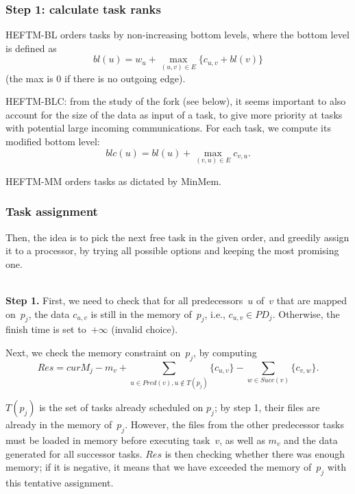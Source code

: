 \documentclass[sigconf,review,anonymous]{acmart}
\newcommand{\curM}{curM}
\begin{document}
\subsubsection{Step 1: calculate task ranks}

HEFTM-BL orders tasks by non-increasing bottom levels, where the bottom
level is defined as
$$bl(u) = w_u + \max_{(u,v)\in E} \{c_{u,v} + bl(v)\}$$
 (the max is 0 if there is no outgoing edge). 
 
 HEFTM-BLC: from the study of the fork (see below), it seems important
 to also account for the size of the data as input of a task,
 to give more priority at tasks with potential large incoming communications.
 For each task, we compute its modified bottom level: 
 $$blc(u) = bl(u) + \max_{(v,u)\in E} c_{v,u}   . $$
 
 
HEFTM-MM orders tasks as dictated by MinMem.

\subsubsection{Task assignment}

Then, the idea is to pick the next free task in the given order,
and greedily assign it to a processor, by trying all possible options
and keeping the most promising one. 

\medskip
{}\\
{\bf Step 1.} First, we need to check that for all predecessors~$u$ of~$v$ that are mapped
on~$p_j$, the data $c_{u,v}$ is still in the memory of~$p_j$, 
i.e., $c_{u,v}\in PD_j$. Otherwise, the finish time is set to~$+\infty$ (invalid choice). 

\smallskip
{} Next, we check the memory constraint on~$p_j$, by computing
\[Res = \curM_j  - m_v + \sum_{u \in Pred(v), u\notin T(p_j)}  \{c_{u,v}\}
- \sum_{w\in Succ(v)}  \{c_{v,w}\}.\]

$T(p_j)$ is the set of tasks already scheduled on $p_j$; by step 1, their files are
already in the memory of~$p_j$. However, the files from the 
other predecessor tasks must be loaded in memory before executing task~$v$,
as well as $m_v$ and the data generated for all successor tasks.
$Res$ is then checking whether there was enough memory; if it is negative,
it means that we have exceeded the memory of~$p_j$ with this tentative 
assignment. 
\end{document}
